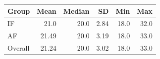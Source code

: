 \begin{tabular}{lrrrrr}
  \toprule
  Group & Mean & Median & SD & Min & Max \\ 
  \midrule
  IF & 21.0 & 20.0 & 2.84 & 18.0 & 32.0 \\ 
  AF & 21.49 & 20.0 & 3.19 & 18.0 & 33.0 \\ 
  Overall & 21.24 & 20.0 & 3.02 & 18.0 & 33.0 \\ 
  \bottomrule
\end{tabular}
